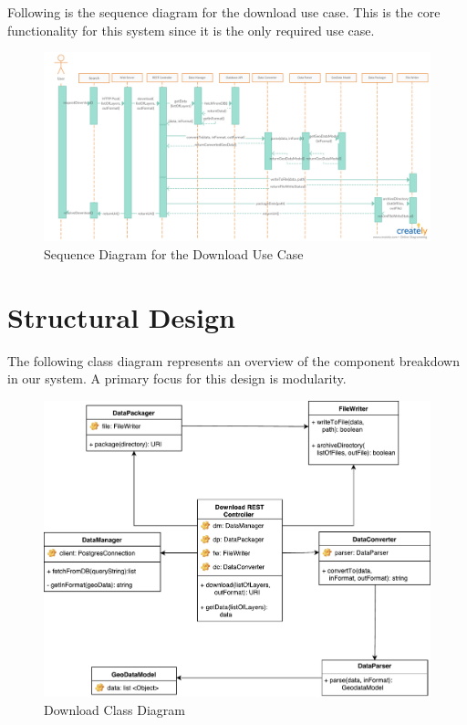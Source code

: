 \documentclass{article}
\begin{document}
Following is the sequence diagram for the download use case. This is the core functionality for this system since it is the only required use case. 

\begin{figure}[H]
	\begin{center}
		\caption{Sequence Diagram for the Download Use Case}
		\includegraphics[width=\textwidth]{images/download_sequence_diagram_v3.png}
	\end{center}
\end{figure}

\clearpage

\section{Structural Design}

The following class diagram represents an overview of the component breakdown in our system. 
A primary focus for this design is modularity.  

\begin{figure}[H]
	\begin{center}
		\caption{Download Class Diagram}
		\includegraphics[width=\textwidth]{images/class_diagram.pdf}
	\end{center}
\end{figure}
\end{document}

